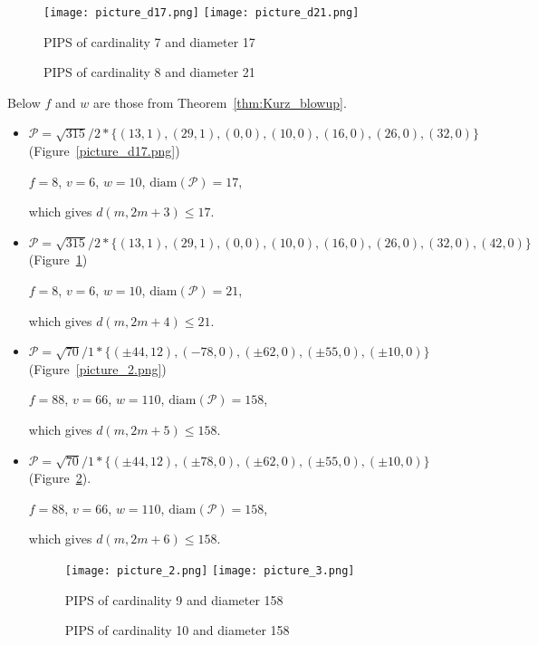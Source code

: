\documentclass[12pt]{article}
\theoremstyle{theorem}
\theoremstyle{dfn}
\theoremstyle{remark}
\begin{document}
\begin{figure}[htbp]
	\texttt{[image: picture\_d17.png]}
	\hfill
	\texttt{[image: picture\_d21.png]}
	\\
	\parbox{.48\linewidth}{\caption{PIPS of cardinality 7 and diameter 17}
	\label{picture_d17.png}}
	\hfill
	\parbox{.48\linewidth}{\caption{PIPS of cardinality 8 and diameter 21}
	\label{picture_d21.png}}
\end{figure}

Below $f$ and $w$ are those from Theorem~\ref{thm:Kurz_blowup}.

\begin{itemize}
\setlength{\itemsep}{-1mm}

\item
$\mathcal{P}=\sqrt{315}/{2} * \{ (13, 1),
(29, 1),
(0, 0),
(10, 0),
(16, 0),
(26, 0),
(32, 0)\}
$
(Figure~\ref{picture_d17.png})

$f = 8$, $v = 6$, $w = 10$, $\operatorname{diam(\mathcal{P})} = 17$,

which gives $d(m, 2m + 3) \leq 17$.


\item
$\mathcal{P}=\sqrt{315}/{2} * \{ (13, 1),
(29, 1),
(0, 0),
(10, 0),
(16, 0),
(26, 0),
(32, 0),
(42, 0)\}
$
(Figure~\ref{picture_d21.png})

$f = 8$, $v = 6$, $w = 10$, $\operatorname{diam(\mathcal{P})} = 21$,

which gives $d(m, 2m + 4) \leq 21$.


\item
$\mathcal{P}=\sqrt{70}/{1} * \{ (\pm 44, 12),
(-78 , 0),
(\pm 62, 0),
(\pm 55 , 0),
(\pm 10 , 0)\}
$
(Figure~\ref{picture_2.png})

$f = 88$, $v = 66$, $w = 110$, $\operatorname{diam(\mathcal{P})} = 158$,

which gives $d(m, 2m + 5) \leq 158$.


\item
$\mathcal{P}=\sqrt{70}/{1} * \{ (\pm 44, 12),
(\pm 78 , 0),
(\pm 62, 0),
(\pm 55 , 0),
(\pm 10 , 0)\}
$
(Figure~\ref{picture_3.png}).

$f = 88$, $v = 66$, $w = 110$, $\operatorname{diam(\mathcal{P})} = 158$,

which gives $d(m, 2m + 6) \leq 158$.


\begin{figure}[h!]
	\texttt{[image: picture\_2.png]}
	\hfill
	\texttt{[image: picture\_3.png]}
	\\
	\parbox{.48\linewidth}{\caption{PIPS of cardinality 9 and diameter 158}
	\label{picture_2.png}}
	\hfill
	\parbox{.48\linewidth}{\caption{PIPS of cardinality 10 and diameter 158}
	\label{picture_3.png}}
\end{figure}



\end{itemize}
\end{document}
